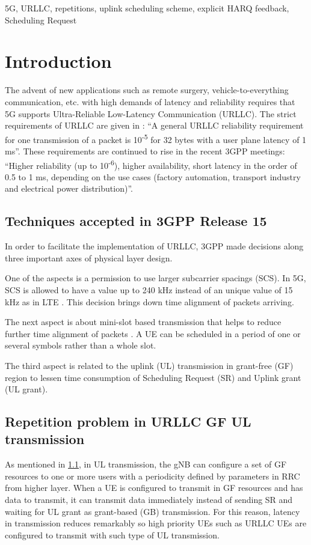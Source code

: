 \documentclass[conference]{IEEEtran}
\begin{document}
\begin{IEEEkeywords}
5G, URLLC, repetitions, uplink scheduling scheme, explicit HARQ feedback, Scheduling Request
\end{IEEEkeywords}

\section{Introduction} \label{I}
The advent of new applications such as remote surgery, vehicle-to-everything communication, etc. with high demands of latency and reliability requires that 5G supports Ultra-Reliable Low-Latency Communication (URLLC). The strict requirements of URLLC are given in \cite{b6}: ``A general URLLC reliability requirement for one transmission of a packet is 10\textsuperscript{-5} for 32 bytes with a user plane latency of 1 ms''. These requirements are continued to rise in the recent 3GPP meetings: ``Higher reliability (up to 10\textsuperscript{-6}), higher availability, short latency in the order of 0.5 to 1 ms, depending on the use cases (factory automation, transport industry and electrical power distribution)''\cite{b8}.

\subsection{Techniques accepted in 3GPP Release 15}\label{IAA}
In order to facilitate the implementation of URLLC, 3GPP made decisions along three important axes of physical layer design.

One of the aspects is a permission to use larger subcarrier spacings (SCS). In 5G, SCS is allowed to have a value up to 240 kHz instead of an unique value of 15 kHz as in LTE \cite{ad2}. This decision brings down time alignment of packets arriving. 

The next aspect is about mini-slot based transmission that helps to reduce further time alignment of packets \cite{ad3}. A UE can be scheduled in a period of one or several symbols rather than a whole slot. 

The third aspect is related to the uplink (UL) transmission in grant-free (GF) region to lessen time consumption of Scheduling Request (SR) and Uplink grant (UL grant)\cite{ad4}.

\subsection{Repetition problem in URLLC GF UL transmission}\label{IBB}
As mentioned in \ref{IAA}, in UL transmission, the gNB can configure a set of GF resources to one or more users with a periodicity defined by parameters in RRC from higher layer. When a UE is configured to transmit in GF resources and has data to transmit, it can transmit data immediately instead of sending SR and waiting for UL grant as grant-based (GB) transmission. For this reason, latency in transmission reduces remarkably so high priority UEs such as URLLC UEs are configured to transmit with such type of UL transmission.
\end{document}
